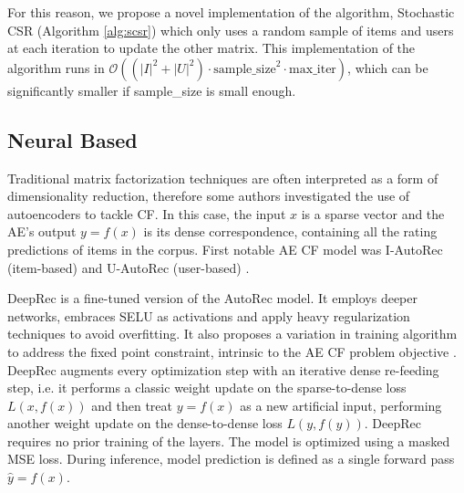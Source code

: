 \documentclass[sigconf]{acmart}
\begin{document}
For this reason, we propose a novel implementation of the algorithm, Stochastic CSR (Algorithm \ref{alg:scsr}) which only uses a random sample of items and users at each iteration to update the other matrix. 
This implementation of the algorithm runs in  $\mathcal{O}((|I|^2 + |U|^2) \cdot \textrm{sample\_size}^2 \cdot \textrm{max\_iter})$, which can be significantly smaller if sample\_size is small enough. 

\subsection{Neural Based}
Traditional matrix factorization techniques are often interpreted as a form of dimensionality reduction, therefore some authors investigated the use of autoencoders to tackle CF.
In this case, the input $x$ is a sparse vector and the AE's output $y = f(x)$ is its dense correspondence, containing all the rating predictions of items in the corpus. First notable AE CF model was I-AutoRec (item-based) and U-AutoRec (user-based) \cite{autorec}. 

DeepRec \cite{deeprec} is a fine-tuned version of the AutoRec model. It employs deeper networks, embraces SELU as activations \cite{selu} and apply heavy regularization techniques to avoid overfitting. 
It also proposes a variation in training algorithm to address the fixed point constraint, intrinsic to the AE CF problem objective \cite{deeprec}. 
DeepRec augments every optimization step with an iterative dense re-feeding step, i.e. it performs a classic weight update on the sparse-to-dense loss $L(x, f(x))$ and then treat $y = f(x)$ as a new artificial input, performing another weight update on the dense-to-dense loss $L(y,f(y))$.
DeepRec requires no prior training of the layers.
The model is optimized using a masked MSE loss.
During inference, model prediction is defined as a single forward pass $\hat{y} = f(x)$.
\end{document}
